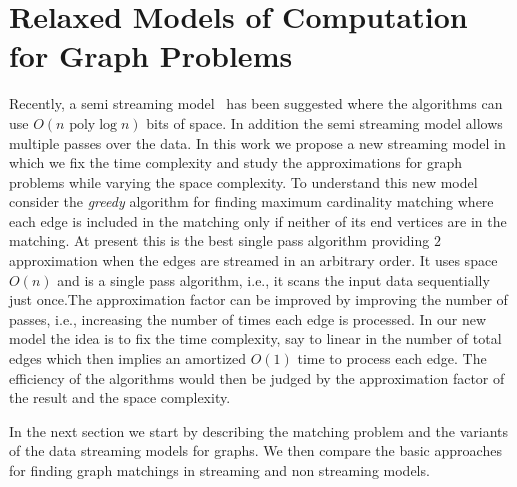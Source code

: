 \documentclass{scrartcl}
\begin{document}
\section{Relaxed Models of Computation for Graph Problems}
%

Recently, a semi streaming model~\cite{Muthukrishnan03} has been suggested where the algorithms can use $O(n \text{ poly} \log n)$ bits of space. In addition the semi streaming model allows multiple passes over the data.  In this work we propose a new streaming model in which we fix the time complexity and study the approximations for graph problems while varying the space complexity. To understand this new model consider the \emph{greedy} algorithm for finding maximum cardinality matching where each edge is included in the matching only if neither of its end vertices are in the matching. At present this is the best single pass algorithm providing $2$ approximation when the edges are streamed in an arbitrary order. It uses space $O(n)$ and is a single pass algorithm, i.e., it scans the input data sequentially just once.The approximation factor can be improved by improving the number of passes, i.e., increasing the number of times each edge is processed. In our new model the idea is to fix the time complexity, say to linear in the number of total edges which then implies an amortized $O(1)$ time to process each edge. The efficiency of the algorithms would then be judged by the approximation factor of the result and the space complexity.  

In the next section we start by describing the matching problem and the variants of the data streaming models for graphs. We then compare the basic approaches for finding graph matchings in streaming and non streaming models.
\end{document}
